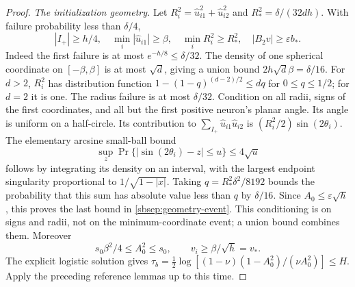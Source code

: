 \documentclass{article} %
\theoremstyle{plain}
\theoremstyle{definition}
\theoremstyle{remark}
\begin{document}
\begin{proof}
\emph{The initialization geometry.}
Let $R_i^2=\widehat u_{i1}^2+\widehat u_{i2}^2$ and
$R_*^2=\delta/(32dh)$. With failure probability less than $\delta/4$,
\begin{equation}\label{sbsep:geometry-event}
 |I_+|\ge h/4,\quad
 \min_i|\widehat u_{i1}|\ge\beta,\quad
 \min_iR_i^2\ge R_*^2,\quad |B_2v|\ge\varepsilon b_*.
\end{equation}
Indeed the first failure is at most $e^{-h/8}\le\delta/32$.
The density of one spherical coordinate on $[-\beta,\beta]$ is at most
$\sqrt d$, giving a union bound $2h\sqrt d\beta=\delta/16$.
For $d>2$, $R_i^2$ has distribution function
$1-(1-q)^{(d-2)/2}\le dq$ for $0\le q\le1/2$; for $d=2$ it is one.
The radius failure is at most $\delta/32$.
Condition on all radii, signs of the first coordinates, and all but the
first positive neuron's planar angle. Its angle is uniform on a
half-circle. Its contribution to
$\sum_{I_+}\widehat u_{i1}\widehat u_{i2}$ is
$(R_i^2/2)\sin(2\theta_i)$. The elementary arcsine small-ball bound
\[
 \sup_z\Pr\{|\sin(2\theta_i)-z|\le u\}\le4\sqrt u
\]
follows by integrating its density on an interval, with the largest
endpoint singularity proportional to $1/\sqrt{1-|x|}$.
Taking $q=R_*^2\delta^2/8192$ bounds the probability that this sum has
absolute value less than $q$ by $\delta/16$.
Since $A_0\le\varepsilon\sqrt h$, this proves the last bound in
\eqref{sbsep:geometry-event}. This conditioning is on signs and radii,
not on the minimum-coordinate event; a union bound combines them.
Moreover
\[
 s_0\beta^2/4\le A_0^2\le s_0,\qquad v_i\ge\beta/\sqrt h=v_*.
\]
The explicit logistic solution gives
$\tau_b=\tfrac12\log[(1-\nu)(1-A_0^2)/(\nu A_0^2)]\le H$.
Apply the preceding reference lemmas up to this time.


\end{proof}
\end{document}
